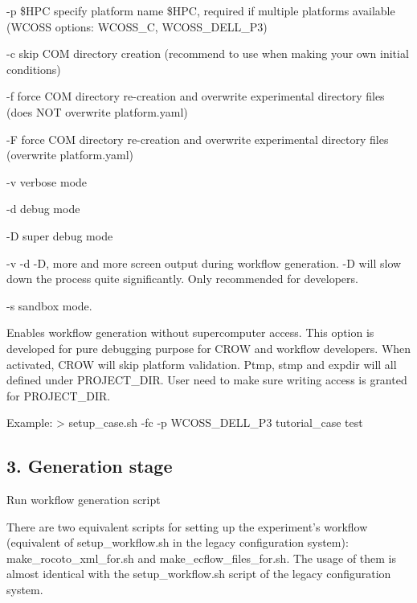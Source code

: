 \begin{DoxyItemize}
\item -\/p \$\-H\-P\-C specify platform name \$\-H\-P\-C, required if multiple platforms available (W\-C\-O\-S\-S options\-: W\-C\-O\-S\-S\-\_\-\-C, W\-C\-O\-S\-S\-\_\-\-D\-E\-L\-L\-\_\-\-P3)
\item -\/c skip C\-O\-M directory creation (recommend to use when making your own initial conditions)
\item -\/f force C\-O\-M directory re-\/creation and overwrite experimental directory files (does N\-O\-T overwrite platform.\-yaml)
\item -\/\-F force C\-O\-M directory re-\/creation and overwrite experimental directory files (overwrite platform.\-yaml)
\item -\/v verbose mode
\item -\/d debug mode
\item -\/\-D super debug mode
\item -\/v -\/d -\/\-D, more and more screen output during workflow generation. -\/\-D will slow down the process quite significantly. Only recommended for developers.
\item -\/s sandbox mode.
\end{DoxyItemize}

Enables workflow generation without supercomputer access. This option is developed for pure debugging purpose for C\-R\-O\-W and workflow developers. When activated, C\-R\-O\-W will skip platform validation. Ptmp, stmp and expdir will all defined under P\-R\-O\-J\-E\-C\-T\-\_\-\-D\-I\-R. User need to make sure writing access is granted for P\-R\-O\-J\-E\-C\-T\-\_\-\-D\-I\-R. \begin{DoxyVerb}Example:    > setup_case.sh -fc -p WCOSS_DELL_P3 tutorial_case test
\end{DoxyVerb}


\subsection*{3. Generation stage }

Run workflow generation script

There are two equivalent scripts for setting up the experiment’s workflow (equivalent of setup\-\_\-workflow.\-sh in the legacy configuration system)\-: make\-\_\-rocoto\-\_\-xml\-\_\-for.\-sh and make\-\_\-ecflow\-\_\-files\-\_\-for.\-sh. The usage of them is almost identical with the setup\-\_\-workflow.\-sh script of the legacy configuration system.

